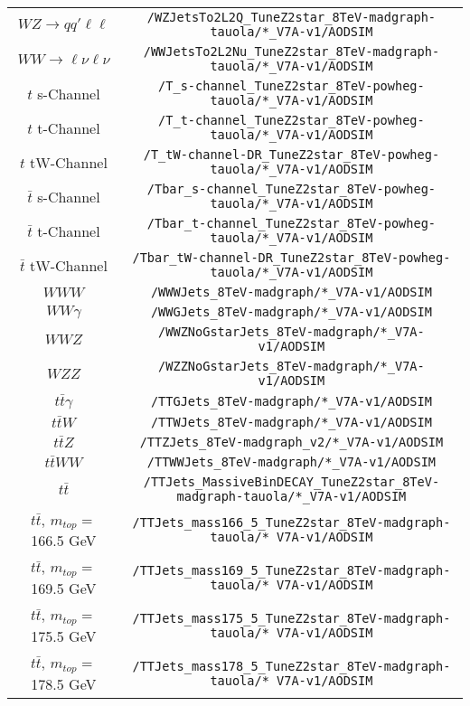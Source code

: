 \begin{table}[htb]
\begin{tabular}{c|c}
$WZ \rightarrow qq'\ell\ell$ & \verb+/WZJetsTo2L2Q_TuneZ2star_8TeV-madgraph-tauola/*_V7A-v1/AODSIM+ \\
$WW \rightarrow \ell\nu \ell\nu$ & \verb+/WWJetsTo2L2Nu_TuneZ2star_8TeV-madgraph-tauola/*_V7A-v1/AODSIM+ \\
\hline 
$t$ s-Channel & \verb+/T_s-channel_TuneZ2star_8TeV-powheg-tauola/*_V7A-v1/AODSIM+ \\
$t$ t-Channel & \verb+/T_t-channel_TuneZ2star_8TeV-powheg-tauola/*_V7A-v1/AODSIM+ \\
$t$ tW-Channel & \verb+/T_tW-channel-DR_TuneZ2star_8TeV-powheg-tauola/*_V7A-v1/AODSIM+ \\
$\bar{t}$ s-Channel & \verb+/Tbar_s-channel_TuneZ2star_8TeV-powheg-tauola/*_V7A-v1/AODSIM+ \\
$\bar{t}$ t-Channel & \verb+/Tbar_t-channel_TuneZ2star_8TeV-powheg-tauola/*_V7A-v1/AODSIM+ \\
$\bar{t}$ tW-Channel & \verb+/Tbar_tW-channel-DR_TuneZ2star_8TeV-powheg-tauola/*_V7A-v1/AODSIM+ \\
\hline 
$WWW$ & \verb+/WWWJets_8TeV-madgraph/*_V7A-v1/AODSIM+ \\
$WW\gamma$ & \verb+/WWGJets_8TeV-madgraph/*_V7A-v1/AODSIM+ \\
$WWZ$ & \verb+/WWZNoGstarJets_8TeV-madgraph/*_V7A-v1/AODSIM+ \\
$WZZ$ & \verb+/WZZNoGstarJets_8TeV-madgraph/*_V7A-v1/AODSIM+ \\
$t\bar{t}\gamma$ & \verb+/TTGJets_8TeV-madgraph/*_V7A-v1/AODSIM+ \\
$t\bar{t}W$ & \verb+/TTWJets_8TeV-madgraph/*_V7A-v1/AODSIM+ \\
$t\bar{t}Z$ & \verb+/TTZJets_8TeV-madgraph_v2/*_V7A-v1/AODSIM+ \\
$t\bar{t}WW$ & \verb+/TTWWJets_8TeV-madgraph/*_V7A-v1/AODSIM+ \\
\hline 
$t\bar{t}$ & \verb+/TTJets_MassiveBinDECAY_TuneZ2star_8TeV-madgraph-tauola/*_V7A-v1/AODSIM+ \\
$t\bar{t}$, $m_{top} =$ 166.5 GeV & \verb+/TTJets_mass166_5_TuneZ2star_8TeV-madgraph-tauola/* V7A-v1/AODSIM+ \\
$t\bar{t}$, $m_{top} =$ 169.5 GeV & \verb+/TTJets_mass169_5_TuneZ2star_8TeV-madgraph-tauola/* V7A-v1/AODSIM+ \\
$t\bar{t}$, $m_{top} =$ 175.5 GeV & \verb+/TTJets_mass175_5_TuneZ2star_8TeV-madgraph-tauola/* V7A-v1/AODSIM+ \\
$t\bar{t}$, $m_{top} =$ 178.5 GeV & \verb+/TTJets_mass178_5_TuneZ2star_8TeV-madgraph-tauola/* V7A-v1/AODSIM+ \\

\end{tabular}
\end{table}
